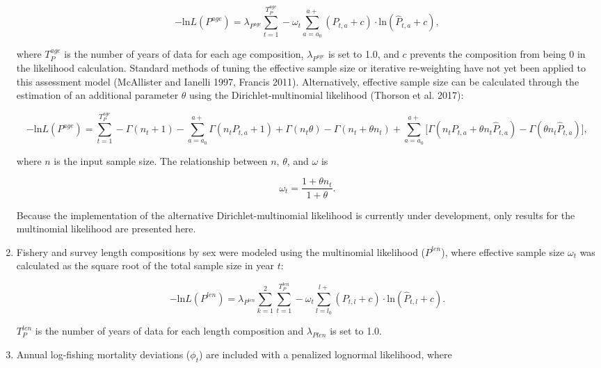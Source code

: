 \documentclass[]{article}
\begin{document}
\begin{enumerate}
  \begin{equation}
  -\mbox{ln}L(P^{age})=\lambda_{P^{age}}\sum_{t=1}^{T_P^{age}} - \omega_t \sum_{a=a_0}^{a+} (P_{t,a}+c)\cdot\mbox{ln}(\hat{P}_{t,a}+c),
  \label{eq:agemult}
  \end{equation}

  where \(T_P^{age}\) is the number of years of data for each age
  composition, \(\lambda_{P^{age}}\) is set to 1.0, and \(c\) prevents
  the composition from being 0 in the likelihood calculation. Standard
  methods of tuning the effective sample size or iterative re-weighting
  have not yet been applied to this assessment model (McAllister and
  Ianelli 1997, Francis 2011). Alternatively, effective sample size can
  be calculated through the estimation of an additional parameter
  \(\theta\) using the Dirichlet-multinomial likelihood (Thorson et al.
  2017):

  \begin{equation}
  -\mbox{ln}L(P^{age})=\sum_{t=1}^{T_P^{age}} -\Gamma(n_t+1)-\sum_{a=a_0}^{a+}\Gamma(n_t P_{t,a}+1)+\Gamma(n_t\theta)-\Gamma(n_t+\theta n_t)+\sum_{a=a_0}^{a+}\Big[\Gamma(n_tP_{t,a}+\theta n_t \hat{P}_{t,a})-\Gamma(\theta n_t \hat{P}_{t,a})\Big],
  \label{eq:agedirich}
  \end{equation}

  where \(n\) is the input sample size. The relationship between \(n\),
  \(\theta\), and \(\omega\) is

  \begin{equation}
  \omega_t = \frac{1+\theta n_t}{1+\theta}.
  \label{eq:effn}
  \end{equation}

  Because the implementation of the alternative Dirichlet-multinomial
  likelihood is currently under development, only results for the
  multinomial likelihood are presented here.
\item
  Fishery and survey length compositions by sex were modeled using the
  multinomial likelihood (\(P^{len}\)), where effective sample size
  \(\omega_t\) was calculated as the square root of the total sample
  size in year \(t\):

  \begin{equation}
  -\mbox{ln}L(P^{len})=\lambda_{P^{len}}\sum_{k=1}^{2}\sum_{t=1}^{T_P^{len}} - \omega_t \sum_{l=l_0}^{l+} (P_{t,l}+c)\cdot\mbox{ln}(\hat{P}_{t,l}+c).
  \label{eq:lenmult}
  \end{equation}

  \(T_P^{len}\) is the number of years of data for each length
  composition and \(\lambda_{Plen}\) is set to 1.0.
\item
  Annual log-fishing mortality deviations (\(\phi_t\)) are included with
  a penalized lognormal likelihood, where


\end{enumerate}
\end{document}
